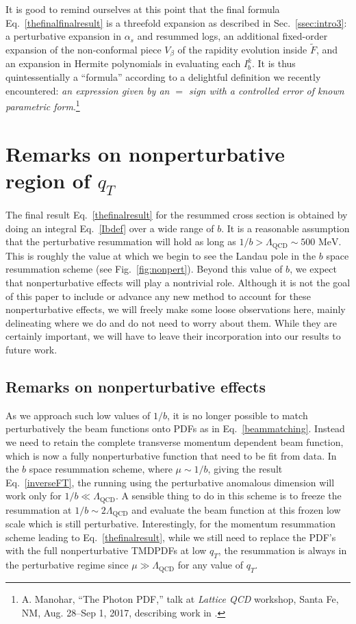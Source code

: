 \documentclass[a4,letterpaper,11pt]{article}
\newcommand{\Lqcd}{\Lambda_{\text{QCD}}}
\newcommand{\as}{\alpha_s}
\newcommand{\wt}{\widetilde}
\newcommand{\eq}[1]{Eq.~\eqref{#1}}
\newcommand{\ssec}[1]{Sec.~\ref{ssec:#1}}
\newcommand{\fig}[1]{Fig.~\ref{fig:#1}}
\begin{document}
It is good to remind ourselves at this point that the final formula \eq{thefinalfinalresult} is a threefold expansion as described in \ssec{intro3}: a perturbative expansion in $\as$ and resummed logs, an additional fixed-order expansion of the non-conformal piece $V_\beta$ of the rapidity evolution inside $\wt F$, and an expansion in Hermite polynomials in evaluating each $I_b^k$. It is thus quintessentially a ``formula'' according to a delightful definition we recently encountered: \emph{an expression given by an $=$ sign with a controlled error of known parametric form}.\footnote{A. Manohar, ``The Photon PDF,'' talk at \emph{Lattice QCD} workshop, Santa Fe, NM, Aug. 28--Sep 1, 2017, describing work in \cite{Manohar:2016nzj,Manohar:2017eqh}.}





\section{Remarks on nonperturbative region of $q_T$} 
\label{sec:non_pert}


The final result  \eq{thefinalresult} for the resummed cross section is obtained by doing an integral \eq{Ibdef} over a wide range of $b$. It is a reasonable assumption that the perturbative resummation will hold as long as $1/b > \Lambda_{\text{QCD}} \sim 500\text{ MeV}$. This is roughly the value at which we begin to see the Landau pole in the $b$ space resummation scheme (see \fig{nonpert}).  Beyond this value of $b$, we expect that nonperturbative effects will play a nontrivial role. Although it is not the goal of this paper to include or advance any new method to account for these nonperturbative effects, we will freely make some loose observations here, mainly delineating where we do and do not need to worry about them. While they are certainly important, we will have to leave their incorporation into our results to future work.


\subsection{Remarks on nonperturbative effects}

As we approach such low values of $1/b$, it is no longer possible to match perturbatively the beam functions  onto PDFs as in \eq{beammatching}. Instead we need to retain the complete transverse momentum dependent beam function, which is now a fully nonperturbative function that need to be fit from data.  In the $b$ space resummation scheme, where $\mu \sim 1/b$, giving the result \eq{inverseFT},  the running using the perturbative anomalous dimension will work only for $ 1/b \ll \Lqcd$. A sensible thing to do in this scheme is to freeze the resummation at $ 1/b \sim 2 \Lqcd$ and evaluate the beam function at this frozen low scale which is still perturbative. Interestingly, for the momentum resummation scheme leading to \eq{thefinalresult}, while we still need to replace the PDF's with the full nonperturbative TMDPDFs at low $q_T$, the resummation is always in the perturbative regime since  $\mu \gg \Lqcd$ for any value of $q_T$. 
\end{document}
